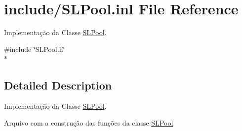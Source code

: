 \hypertarget{_s_l_pool_8inl}{}\section{include/\+S\+L\+Pool.inl File Reference}
\label{_s_l_pool_8inl}


Implementação da Classe \hyperlink{class_s_l_pool}{S\+L\+Pool}.  


{\ttfamily \#include \char`\"{}S\+L\+Pool.\+h\char`\"{}}\\*


\subsection{Detailed Description}
Implementação da Classe \hyperlink{class_s_l_pool}{S\+L\+Pool}. 

Arquivo com a construção das funções da classe \hyperlink{class_s_l_pool}{S\+L\+Pool} 